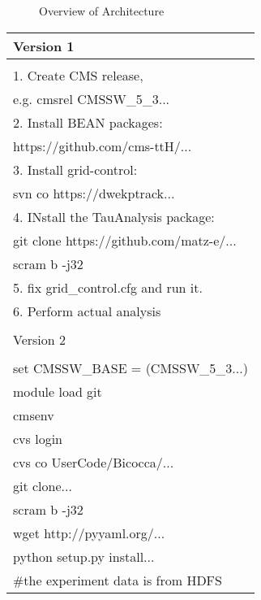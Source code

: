 \documentclass{acm_proc_article-sp}
\begin{document}
\begin{figure*}
\centering
{}
\caption{Overview of Architecture}
\label{fig:Overview of architecture}
\end{figure*}

\begin{table}
    \centering
    \begin{tabular}{|l|}
        \hline
        Version 1\\ \hline
        \\
        1. Create CMS release,\\
            \hspace{9pt} e.g. cmsrel CMSSW\_5\_3... \\
        2. Install BEAN packages: \\
            \hspace{9pt} https://github.com/cms-ttH/...\\
        3. Install grid-control: \\ 
            \hspace{9pt} svn co https://dwekptrack... \\
        4. INstall the TauAnalysis package: \\
           \hspace{9pt} git clone https://github.com/matz-e/... \\
           \hspace{9pt} scram b -j32 \\
        5. fix grid\_control.cfg and run it. \\
        6. Perform actual analysis \\ 
        \\ \hline
        Version 2\\ \hline
        \\
        set CMSSW\_BASE = (CMSSW\_5\_3...) \\
        module load git \\        
        cmsenv \\ 
        cvs login \\
        cvs co UserCode/Bicocca/... \\
        git clone... \\
        scram b -j32 \\
        wget http://pyyaml.org/... \\
        python setup.py install... \\
        \#the experiment data is from HDFS \\

\end{tabular}
\end{table}
\end{document}
